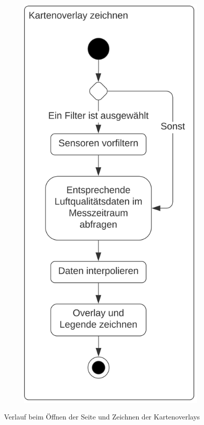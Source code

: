 \begin{center}
\begin{figure}
\begin{subfigure}[c]{0.5\textwidth}
\includegraphics[scale=0.19]{media/activity-usage/KartenoverlayZeichnen}
\end{subfigure}
\caption{Verlauf beim Öffnen der Seite und Zeichnen der Kartenoverlays}
\end{figure}


\end{center}

